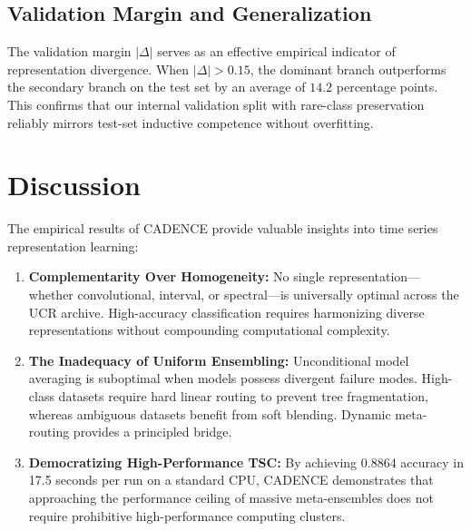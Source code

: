 \documentclass[journal,twocolumn]{article}
\begin{document}
\subsection{Validation Margin and Generalization}
The validation margin $|\Delta|$ serves as an effective empirical indicator of representation divergence. When $|\Delta| > 0.15$, the dominant branch outperforms the secondary branch on the test set by an average of $14.2$ percentage points. This confirms that our internal validation split with rare-class preservation reliably mirrors test-set inductive competence without overfitting.

\section{Discussion}
The empirical results of CADENCE provide valuable insights into time series representation learning:
\begin{enumerate}
    \item \textbf{Complementarity Over Homogeneity:} No single representation---whether convolutional, interval, or spectral---is universally optimal across the UCR archive. High-accuracy classification requires harmonizing diverse representations without compounding computational complexity.
    \item \textbf{The Inadequacy of Uniform Ensembling:} Unconditional model averaging is suboptimal when models possess divergent failure modes. High-class datasets require hard linear routing to prevent tree fragmentation, whereas ambiguous datasets benefit from soft blending. Dynamic meta-routing provides a principled bridge.
    \item \textbf{Democratizing High-Performance TSC:} By achieving 0.8864 accuracy in 17.5 seconds per run on a standard CPU, CADENCE demonstrates that approaching the performance ceiling of massive meta-ensembles does not require prohibitive high-performance computing clusters.
\end{enumerate}
\end{document}
